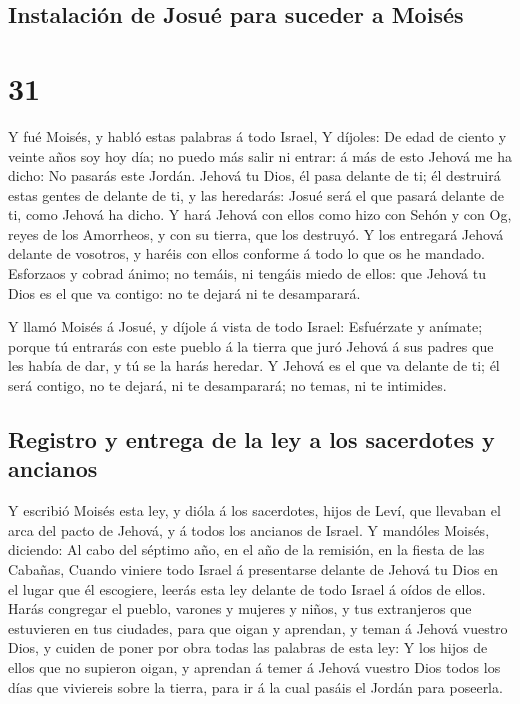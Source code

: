 \hypertarget{instalaciuxf3n-de-josuuxe9-para-suceder-a-moisuxe9s}{%
\subsection{Instalación de Josué para suceder a
Moisés}\label{instalaciuxf3n-de-josuuxe9-para-suceder-a-moisuxe9s}}

\hypertarget{section-30}{%
\section{31}\label{section-30}}

 Y fué Moisés, y habló estas palabras á todo Israel,
 Y díjoles: De edad de ciento y veinte años soy hoy día;
no puedo más salir ni entrar: á más de esto Jehová me ha dicho: No
pasarás este Jordán.  Jehová tu Dios, él pasa delante de
ti; él destruirá estas gentes de delante de ti, y las heredarás: Josué
será el que pasará delante de ti, como Jehová ha dicho.  Y
hará Jehová con ellos como hizo con Sehón y con Og, reyes de los
Amorrheos, y con su tierra, que los destruyó.  Y los
entregará Jehová delante de vosotros, y haréis con ellos conforme á todo
lo que os he mandado.  Esforzaos y cobrad ánimo; no
temáis, ni tengáis miedo de ellos: que Jehová tu Dios es el que va
contigo: no te dejará ni te desamparará.

 Y llamó Moisés á Josué, y díjole á vista de todo Israel:
Esfuérzate y anímate; porque tú entrarás con este pueblo á la tierra que
juró Jehová á sus padres que les había de dar, y tú se la harás heredar.
 Y Jehová es el que va delante de ti; él será contigo, no
te dejará, ni te desamparará; no temas, ni te intimides.

\hypertarget{registro-y-entrega-de-la-ley-a-los-sacerdotes-y-ancianos}{%
\subsection{Registro y entrega de la ley a los sacerdotes y
ancianos}\label{registro-y-entrega-de-la-ley-a-los-sacerdotes-y-ancianos}}

 Y escribió Moisés esta ley, y dióla á los sacerdotes,
hijos de Leví, que llevaban el arca del pacto de Jehová, y á todos los
ancianos de Israel.  Y mandóles Moisés, diciendo: Al cabo
del séptimo año, en el año de la remisión, en la fiesta de las Cabañas,
 Cuando viniere todo Israel á presentarse delante de
Jehová tu Dios en el lugar que él escogiere, leerás esta ley delante de
todo Israel á oídos de ellos.  Harás congregar el pueblo,
varones y mujeres y niños, y tus extranjeros que estuvieren en tus
ciudades, para que oigan y aprendan, y teman á Jehová vuestro Dios, y
cuiden de poner por obra todas las palabras de esta ley: 
Y los hijos de ellos que no supieron oigan, y aprendan á temer á Jehová
vuestro Dios todos los días que viviereis sobre la tierra, para ir á la
cual pasáis el Jordán para poseerla.

